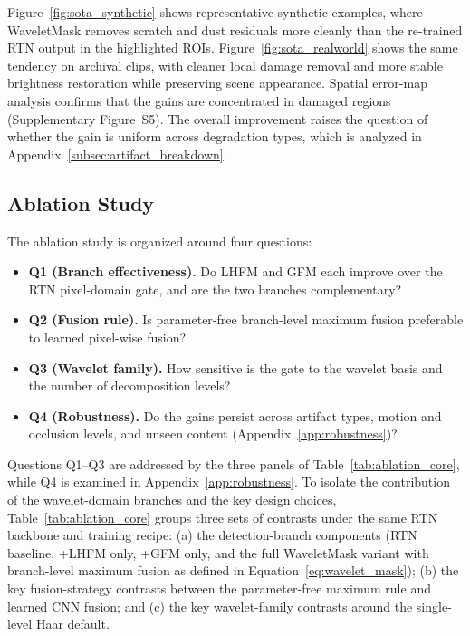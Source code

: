 {Figure~\ref{fig:sota_synthetic} shows representative synthetic examples, where WaveletMask removes scratch and dust residuals more cleanly than the re-trained RTN output in the highlighted ROIs. Figure~\ref{fig:sota_realworld} shows the same tendency on archival clips, with cleaner local damage removal and more stable brightness restoration while preserving scene appearance. Spatial error-map analysis confirms that the gains are concentrated in damaged regions (Supplementary Figure~S5). The overall improvement raises the question of whether the gain is uniform across degradation types, which is analyzed in Appendix~\ref{subsec:artifact_breakdown}.

\subsection{Ablation Study}\label{subsec:ablation}

The ablation study is organized around four questions:
\begin{itemize}
\item \textbf{Q1 (Branch effectiveness).} Do LHFM and GFM each improve over the RTN pixel-domain gate, and are the two branches complementary?
\item \textbf{Q2 (Fusion rule).} Is parameter-free branch-level maximum fusion preferable to learned pixel-wise fusion?
\item \textbf{Q3 (Wavelet family).} How sensitive is the gate to the wavelet basis and the number of decomposition levels?
\item \textbf{Q4 (Robustness).} Do the gains persist across artifact types, motion and occlusion levels, and unseen content (Appendix~\ref{app:robustness})?
\end{itemize}

Questions Q1--Q3 are addressed by the three panels of Table~\ref{tab:ablation_core}, while Q4 is examined in Appendix~\ref{app:robustness}. To isolate the contribution of the wavelet-domain branches and the key design choices, Table~\ref{tab:ablation_core} groups three sets of contrasts under the same RTN backbone and training recipe: (a) the detection-branch components (RTN baseline, +LHFM only, +GFM only, and the full WaveletMask variant with branch-level maximum fusion as defined in Equation~\eqref{eq:wavelet_mask}); (b) the key fusion-strategy contrasts between the parameter-free maximum rule and learned CNN fusion; and (c) the key wavelet-family contrasts around the single-level Haar default.

}

